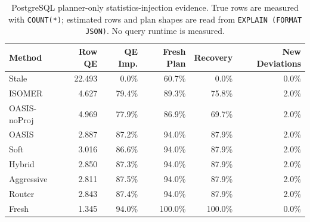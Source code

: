 \begin{table}[t]
  \centering
  \small
  \caption{PostgreSQL planner-only statistics-injection evidence. True rows are measured with \texttt{COUNT(*)}; estimated rows and plan shapes are read from \texttt{EXPLAIN (FORMAT JSON)}. No query runtime is measured.}
  \label{tab:postgres_planner_stats_injection}
  \setlength{\tabcolsep}{4pt}
  \begin{tabular}{lrrrrr}
    \toprule
    Method & Row QE & QE Imp. & Fresh Plan & Recovery & New Deviations \\
    \midrule
    Stale & 22.493 & 0.0\% & 60.7\% & 0.0\% & 0.0\% \\
    ISOMER & 4.627 & 79.4\% & 89.3\% & 75.8\% & 2.0\% \\
    OASIS-noProj & 4.969 & 77.9\% & 86.9\% & 69.7\% & 2.0\% \\
    OASIS & 2.887 & 87.2\% & 94.0\% & 87.9\% & 2.0\% \\
    Soft & 3.016 & 86.6\% & 94.0\% & 87.9\% & 2.0\% \\
    Hybrid & 2.850 & 87.3\% & 94.0\% & 87.9\% & 2.0\% \\
    Aggressive & 2.811 & 87.5\% & 94.0\% & 87.9\% & 2.0\% \\
    Router & 2.843 & 87.4\% & 94.0\% & 87.9\% & 2.0\% \\
    Fresh & 1.345 & 94.0\% & 100.0\% & 100.0\% & 0.0\% \\
    \bottomrule
  \end{tabular}
\end{table}

